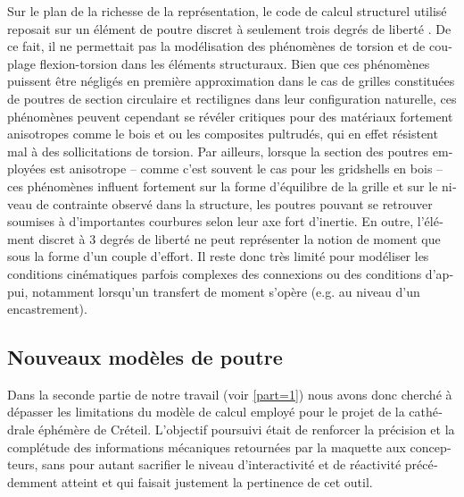 \begin{otherlanguage}{french}
Sur le plan de la richesse de la représentation, le code de calcul structurel utilisé reposait sur un élément de poutre discret à seulement trois degrés de liberté \cite{Adriaenssens2000}. De ce fait, il ne permettait pas la modélisation des phénomènes de torsion et de couplage flexion-torsion dans les éléments structuraux. Bien que ces phénomènes puissent être négligés en première approximation dans le cas de grilles constituées de poutres de section circulaire et rectilignes dans leur configuration naturelle, ces phénomènes peuvent cependant se révéler critiques pour des matériaux fortement anisotropes comme le bois et ou les composites pultrudés, qui en effet résistent mal à des sollicitations de torsion. Par ailleurs, lorsque la section des poutres employées est anisotrope -- comme c'est souvent le cas pour les gridshells en bois -- ces phénomènes influent fortement sur la forme d'équilibre de la grille et sur le niveau de contrainte observé dans la structure, les poutres pouvant se retrouver soumises à d'importantes courbures selon leur axe fort d'inertie. En outre, l'élément discret à 3 degrés de liberté ne peut représenter la notion de moment que sous la forme d'un couple d'effort. Il reste donc très limité pour modéliser les conditions cinématiques parfois complexes des connexions ou des conditions d'appui, notamment lorsqu'un transfert de moment s'opère (e.g. au niveau d'un encastrement).

\subsection*{Nouveaux modèles de poutre}

Dans la seconde partie de notre travail (voir \cref{part=1}) nous avons donc cherché à dépasser les limitations du modèle de calcul employé pour le projet de la cathédrale éphémère de Créteil. L'objectif poursuivi était de renforcer la précision et la complétude des informations mécaniques retournées par la maquette aux concepteurs, sans pour autant sacrifier le niveau d'interactivité et de réactivité précédemment atteint et qui faisait justement la pertinence de cet outil.


\end{otherlanguage}
